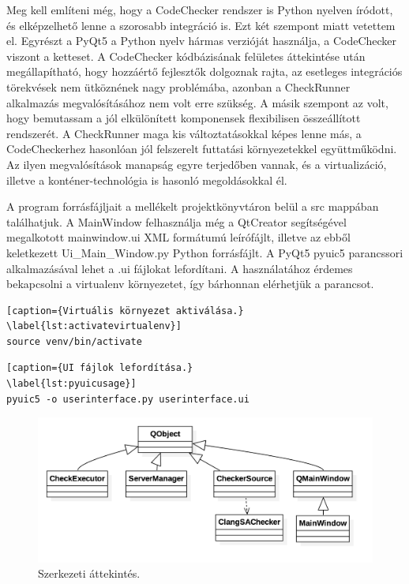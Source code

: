 \documentclass[a4paper,12pt]{report}
\begin{document}
Meg kell említeni még, hogy a CodeChecker rendszer is Python nyelven íródott, és elképzelhető lenne a szorosabb integráció is. Ezt két szempont miatt vetettem el. Egyrészt a PyQt5 a Python nyelv hármas verzióját használja, a CodeChecker viszont a ketteset. A CodeChecker kódbázisának felületes áttekintése után megállapítható, hogy hozzáértő fejlesztők dolgoznak rajta, az esetleges integrációs törekvések nem ütköznének nagy problémába, azonban a CheckRunner alkalmazás megvalósításához nem volt erre szükség. A másik szempont az volt, hogy bemutassam a jól elkülönített komponensek flexibilisen összeállított rendszerét. A CheckRunner maga kis változtatásokkal képes lenne más, a CodeCheckerhez hasonlóan jól felszerelt futtatási környezetekkel együttműködni. Az ilyen megvalósítások manapság egyre terjedőben vannak, és a virtualizáció, illetve a konténer-technológia is hasonló megoldásokkal él.

A program forrásfájljait a mellékelt projektkönyvtáron belül a src mappában találhatjuk. A MainWindow felhasználja még a QtCreator segítségével megalkotott mainwindow.ui XML formátumú leírófájlt, illetve az ebből keletkezett Ui\_Main\_Window.py Python forrásfájlt. A PyQt5 pyuic5 parancssori alkalmazásával lehet a .ui fájlokat lefordítani. A használatához érdemes bekapcsolni a virtualenv környezetet, így bárhonnan elérhetjük a parancsot.

\begin{lstlisting}[caption={Virtuális környezet aktiválása.}
\label{lst:activatevirtualenv}]
source venv/bin/activate
\end{lstlisting}

\begin{lstlisting}[caption={UI fájlok lefordítása.}
\label{lst:pyuicusage}]
pyuic5 -o userinterface.py userinterface.ui
\end{lstlisting}

\begin{figure}[h]
\caption{Szerkezeti áttekintés.}
\centering
\includegraphics[scale=0.3]{UMLattekintes.png}
\end{figure}
\end{document}
